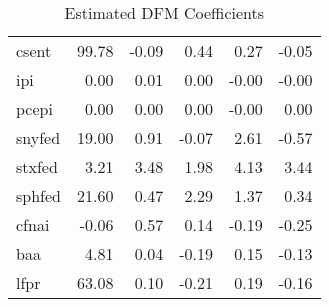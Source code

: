\documentclass[11pt, letterpaper]{article}\usepackage[]{graphicx}\usepackage[]{color}
\begin{document}
\begin{table}[H]
\begin{tabular}{lrrrrr}
  csent & 99.78 & -0.09 & 0.44 & 0.27 & -0.05 \\ 
  ipi & 0.00 & 0.01 & 0.00 & -0.00 & -0.00 \\ 
  pcepi & 0.00 & 0.00 & 0.00 & -0.00 & 0.00 \\ 
  snyfed & 19.00 & 0.91 & -0.07 & 2.61 & -0.57 \\ 
  stxfed & 3.21 & 3.48 & 1.98 & 4.13 & 3.44 \\ 
  sphfed & 21.60 & 0.47 & 2.29 & 1.37 & 0.34 \\ 
  cfnai & -0.06 & 0.57 & 0.14 & -0.19 & -0.25 \\ 
  baa & 4.81 & 0.04 & -0.19 & 0.15 & -0.13 \\ 
  lfpr & 63.08 & 0.10 & -0.21 & 0.19 & -0.16 \\ 
   \hline
\end{tabular}
\endgroup
\caption{Estimated DFM Coefficients} 
\end{table}
\end{document}

